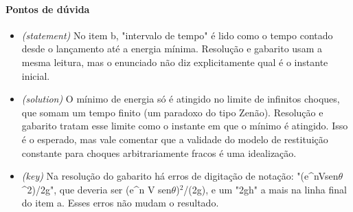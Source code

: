 \documentclass{article}%
\begin{document}
\paragraph{Pontos de dúvida}%
\begin{itemize}%
\item%
\textit{(statement)} No item b, "intervalo de tempo" é lido como o tempo contado desde o lançamento até a energia mínima. Resolução e gabarito usam a mesma leitura, mas o enunciado não diz explicitamente qual é o instante inicial.%
\item%
\textit{(solution)} O mínimo de energia só é atingido no limite de infinitos choques, que somam um tempo finito (um paradoxo do tipo Zenão). Resolução e gabarito tratam esse limite como o instante em que o mínimo é atingido. Isso é o esperado, mas vale comentar que a validade do modelo de restituição constante para choques arbitrariamente fracos é uma idealização.%
\item%
\textit{(key)} Na resolução do gabarito há erros de digitação de notação: "(e\^{}nVsen$\theta$\^{}2)/2g", que deveria ser (e\^{}n V sen$\theta$)$^2$/(2g), e um "2gh" a mais na linha final do item a. Esses erros não mudam o resultado.%
\end{itemize}%
\end{document}
